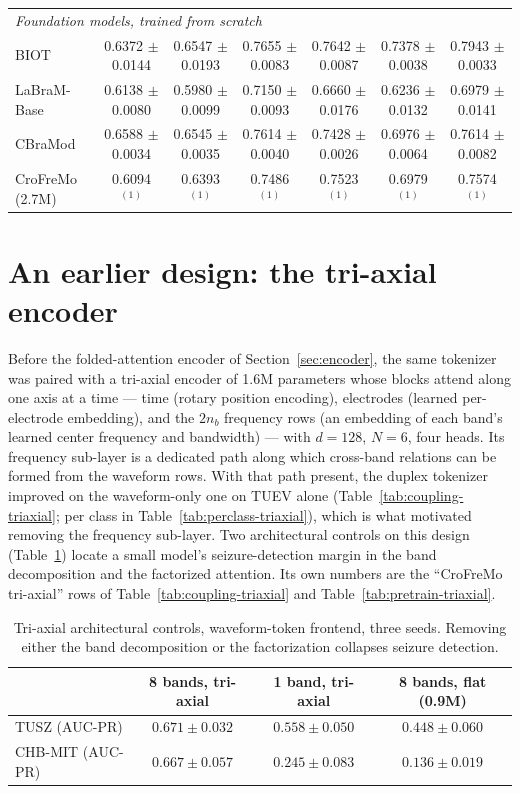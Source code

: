 \begin{table}[t]
{\begin{tabular}{lcccccc}
\midrule
\multicolumn{7}{l}{\textit{Foundation models, trained from scratch}} \\
BIOT & 0.6372 $\pm$ 0.0144 & 0.6547 $\pm$ 0.0193 & 0.7655 $\pm$ 0.0083 & 0.7642 $\pm$ 0.0087 & 0.7378 $\pm$ 0.0038 & 0.7943 $\pm$ 0.0033 \\
LaBraM-Base & 0.6138 $\pm$ 0.0080 & 0.5980 $\pm$ 0.0099 & 0.7150 $\pm$ 0.0093 & 0.6660 $\pm$ 0.0176 & 0.6236 $\pm$ 0.0132 & 0.6979 $\pm$ 0.0141 \\
CBraMod & 0.6588 $\pm$ 0.0034 & 0.6545 $\pm$ 0.0035 & 0.7614 $\pm$ 0.0040 & 0.7428 $\pm$ 0.0026 & 0.6976 $\pm$ 0.0064 & 0.7614 $\pm$ 0.0082 \\
\midrule
CroFreMo (2.7M) & 0.6094$^{(1)}$ & 0.6393$^{(1)}$ & 0.7486$^{(1)}$ & 0.7523$^{(1)}$ & 0.6979$^{(1)}$ & 0.7574$^{(1)}$ \\
\bottomrule
\end{tabular}}
\end{table}

\section{An earlier design: the tri-axial encoder}
\label{app:triaxial}
\label{app:triaxial-coupling}

Before the folded-attention encoder of Section~\ref{sec:encoder}, the
same tokenizer was paired with a tri-axial encoder of 1.6M parameters
whose blocks attend along one axis at a time --- time (rotary position
encoding), electrodes (learned per-electrode embedding), and the $2n_b$
frequency rows (an embedding of each band's learned center frequency and
bandwidth) --- with $d{=}128$, $N{=}6$, four heads. Its frequency
sub-layer is a dedicated path along which cross-band relations can be
formed from the waveform rows. With that path present, the duplex
tokenizer improved on the waveform-only one on TUEV alone
(Table~\ref{tab:coupling-triaxial}; per class in
Table~\ref{tab:perclass-triaxial}), which is what motivated removing the
frequency sub-layer. Two architectural controls on this design
(Table~\ref{tab:arch}) locate a small model's seizure-detection margin in
the band decomposition and the factorized attention. Its own
numbers are the ``CroFreMo tri-axial'' rows of Table~\ref{tab:coupling-triaxial} and Table~\ref{tab:pretrain-triaxial}.
\begin{table}[h]
\centering
\small
\caption{Tri-axial architectural controls, waveform-token frontend, three
seeds. Removing either the band decomposition or the factorization
collapses seizure detection.}
\label{tab:arch}
\begin{tabular}{lccc}
\toprule
 & 8 bands, tri-axial & 1 band, tri-axial & 8 bands, flat (0.9M) \\
\midrule
TUSZ (AUC-PR) & $0.671 \pm 0.032$ & $0.558 \pm 0.050$ & $0.448 \pm 0.060$ \\
CHB-MIT (AUC-PR) & $0.667 \pm 0.057$ & $0.245 \pm 0.083$ & $0.136 \pm 0.019$ \\
\bottomrule
\end{tabular}
\end{table}


